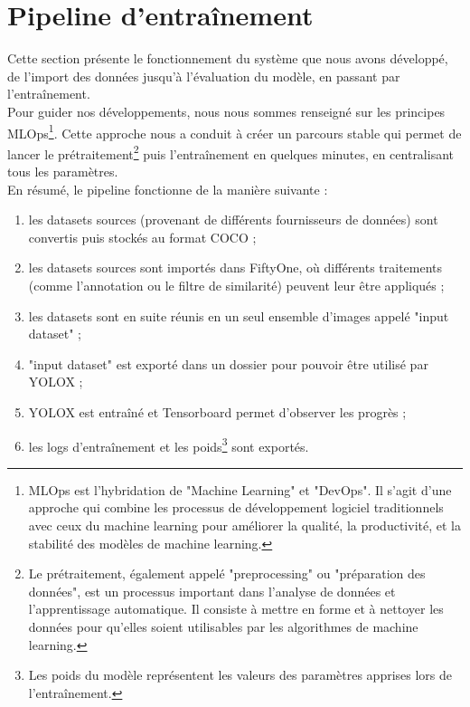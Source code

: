 \section{Pipeline d'entraînement}

Cette section présente le fonctionnement du système que nous avons développé, de l'import des données
jusqu'à l'évaluation du modèle, en passant par l'entraînement. \\

Pour guider nos développements, nous
nous sommes renseigné sur les principes MLOps\footnote{MLOps est l'hybridation de "Machine Learning" et "DevOps".
Il s'agit d'une approche qui combine les processus de développement logiciel traditionnels avec ceux
du machine learning pour améliorer la qualité, la productivité, et la stabilité des modèles de machine learning.}.
Cette approche nous a conduit à créer un parcours stable qui permet de lancer le prétraitement\footnote{
Le prétraitement, également appelé "preprocessing" ou "préparation des données",
est un processus important dans l'analyse de données et l'apprentissage automatique.
Il consiste à mettre en forme et à nettoyer les données pour qu'elles soient utilisables
par les algorithmes de machine learning.} puis l'entraînement en quelques minutes, en
centralisant tous les paramètres.\\

En résumé, le pipeline fonctionne de la manière suivante :

\begin{enumerate}
    \item les datasets sources (provenant de différents fournisseurs de données) sont convertis puis stockés au format
    COCO ;
    \item les datasets sources sont importés dans FiftyOne, où différents traitements (comme
    l'annotation ou le filtre de similarité) peuvent leur être appliqués ;
    \item les datasets sont en suite réunis en un seul ensemble d'images appelé "input dataset" ;
    \item "input dataset" est exporté dans un dossier pour pouvoir être utilisé par YOLOX ;
    \item YOLOX est entraîné et Tensorboard permet d'observer les progrès ; 
    \item les logs d'entraînement et les poids\footnote{Les poids du modèle représentent
    les valeurs des paramètres apprises lors de l'entraînement.} sont exportés.
\end{enumerate}

